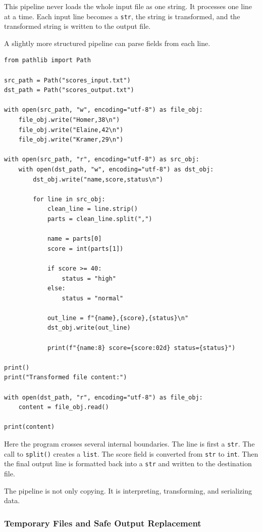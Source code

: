 This pipeline never loads the whole input file as one string. It processes one line at a time. Each input line becomes a \texttt{str}, the string is transformed, and the transformed string is written to the output file.

A slightly more structured pipeline can parse fields from each line.

\begin{verbatim}
from pathlib import Path

src_path = Path("scores_input.txt")
dst_path = Path("scores_output.txt")

with open(src_path, "w", encoding="utf-8") as file_obj:
    file_obj.write("Homer,38\n")
    file_obj.write("Elaine,42\n")
    file_obj.write("Kramer,29\n")

with open(src_path, "r", encoding="utf-8") as src_obj:
    with open(dst_path, "w", encoding="utf-8") as dst_obj:
        dst_obj.write("name,score,status\n")

        for line in src_obj:
            clean_line = line.strip()
            parts = clean_line.split(",")

            name = parts[0]
            score = int(parts[1])

            if score >= 40:
                status = "high"
            else:
                status = "normal"

            out_line = f"{name},{score},{status}\n"
            dst_obj.write(out_line)

            print(f"{name:8} score={score:02d} status={status}")

print()
print("Transformed file content:")

with open(dst_path, "r", encoding="utf-8") as file_obj:
    content = file_obj.read()

print(content)
\end{verbatim}

Here the program crosses several internal boundaries. The line is first a \texttt{str}. The call to \texttt{split()} creates a \texttt{list}. The score field is converted from \texttt{str} to \texttt{int}. Then the final output line is formatted back into a \texttt{str} and written to the destination file.

The pipeline is not only copying. It is interpreting, transforming, and serializing data.

\subsubsection{Temporary Files and Safe Output Replacement}

